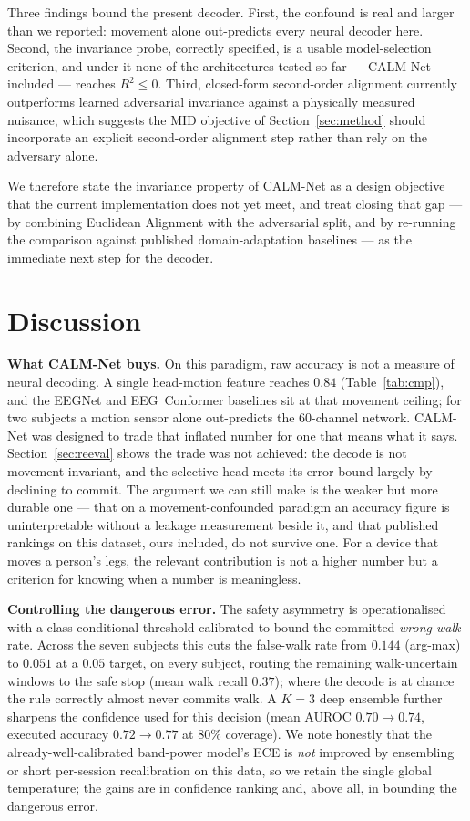 \documentclass[journal]{IEEEtran}
\begin{document}
Three findings bound the present decoder. First, the confound is real and larger than we
reported: movement alone out-predicts every neural decoder here. Second, the invariance
probe, correctly specified, is a usable model-selection criterion, and under it none of
the architectures tested so far --- CALM-Net included --- reaches $R^2 \le 0$. Third,
closed-form second-order alignment currently outperforms learned adversarial invariance
against a physically measured nuisance, which suggests the MID objective of
Section~\ref{sec:method} should incorporate an explicit second-order alignment step
rather than rely on the adversary alone.

We therefore state the invariance property of CALM-Net as a design objective that the
current implementation does not yet meet, and treat closing that gap --- by combining
Euclidean Alignment with the adversarial split, and by re-running the comparison against
published domain-adaptation baselines --- as the immediate next step for the decoder.

\section{Discussion}
\textbf{What CALM-Net buys.} On this paradigm, raw accuracy is not a measure of neural
decoding. A single head-motion feature reaches $0.84$ (Table~\ref{tab:cmp}), and the
EEGNet and EEG~Conformer baselines sit at that movement ceiling; for two subjects a
motion sensor alone out-predicts the $60$-channel network. CALM-Net was designed to trade that
inflated number for one that means what it says. Section~\ref{sec:reeval} shows the
trade was not achieved: the decode is not movement-invariant, and the selective head
meets its error bound largely by declining to commit. The argument we can still make is
the weaker but more durable one --- that on a movement-confounded paradigm an accuracy
figure is uninterpretable without a leakage measurement beside it, and that published
rankings on this dataset, ours included, do not survive one. For a device that moves a
person's legs, the relevant contribution is not a higher number but a criterion for
knowing when a number is meaningless.

\textbf{Controlling the dangerous error.} The safety asymmetry is operationalised
with a class-conditional threshold calibrated to bound the committed \emph{wrong-walk}
rate. Across the seven subjects this cuts the false-walk rate from $0.144$ (arg-max)
to $0.051$ at a $0.05$ target, on every subject, routing the remaining walk-uncertain
windows to the safe stop (mean walk recall $0.37$); where the decode is at chance the
rule correctly almost never commits walk. A $K{=}3$ deep ensemble further sharpens the
confidence used for this decision (mean AUROC $0.70\rightarrow0.74$, executed accuracy
$0.72\rightarrow0.77$ at $80\%$ coverage). We note honestly that the
already-well-calibrated band-power model's ECE is \emph{not} improved by ensembling or
short per-session recalibration on this data, so we retain the single global
temperature; the gains are in confidence ranking and, above all, in bounding the
dangerous error.
\end{document}
